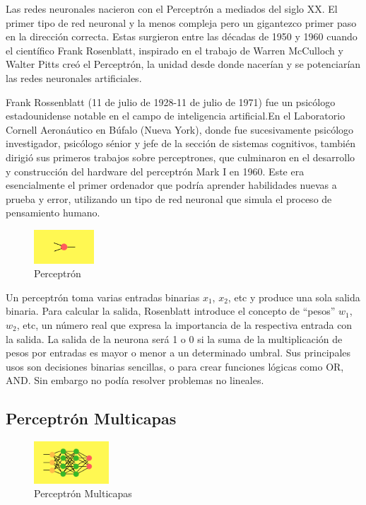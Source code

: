 \documentclass[a4paper]{article}
\begin{document}
Las redes neuronales nacieron con el Perceptrón a mediados del 
siglo XX. El primer tipo de red neuronal y la menos compleja pero 
un gigantezco primer paso en la dirección correcta. Estas surgieron
entre las décadas de 1950 y 1960 cuando el científico Frank Rosenblatt, 
inspirado en el trabajo de Warren McCulloch y Walter Pitts creó el 
Perceptrón, la unidad desde donde nacerían y se potenciarían las 
redes neuronales artificiales\cite{wikipercept}.

Frank Rossenblatt (11 de julio de 1928-11 de julio de 1971) fue un
psicólogo estadounidense notable en el campo de inteligencia
artificial.En el Laboratorio Cornell Aeronáutico en Búfalo (Nueva
York), donde fue sucesivamente psicólogo investigador, psicólogo
sénior y jefe de la sección de sistemas cognitivos,
también dirigió sus primeros trabajos 
sobre perceptrones, que culminaron en el desarrollo
y construcción del hardware del 
perceptrón Mark I en 1960\cite{wikifrank}.
Este era esencialmente el primer ordenador que podría aprender 
habilidades nuevas a prueba y error, utilizando un tipo de red 
neuronal que simula el proceso de pensamiento humano. 

\begin{figure} %
    \centering
    \includegraphics[width=0.2\textwidth]{./images/net_perceptron.png}
    \caption{Perceptrón}
\end{figure}

Un perceptrón toma varias entradas binarias $x_1$, $x_2$, etc y produce 
una sola salida binaria. Para calcular la salida, Rosenblatt 
introduce el concepto de ``pesos'' $w_1$, $w_2$, etc, un número real que 
expresa la importancia de la respectiva entrada con la salida. La 
salida de la neurona será 1 o 0 si la suma de la multiplicación de 
pesos por entradas es mayor o menor a un determinado umbral.
Sus principales usos son decisiones binarias sencillas, o para 
crear funciones lógicas como OR, AND. Sin embargo no podía 
resolver problemas no lineales.

\qquad

\subsection{Perceptrón Multicapas}
\begin{figure} %
    \centering
    \includegraphics[width=0.25\textwidth]{./images/net_multilayer.png}
    \caption{Perceptrón Multicapas}
\end{figure}
\end{document}

